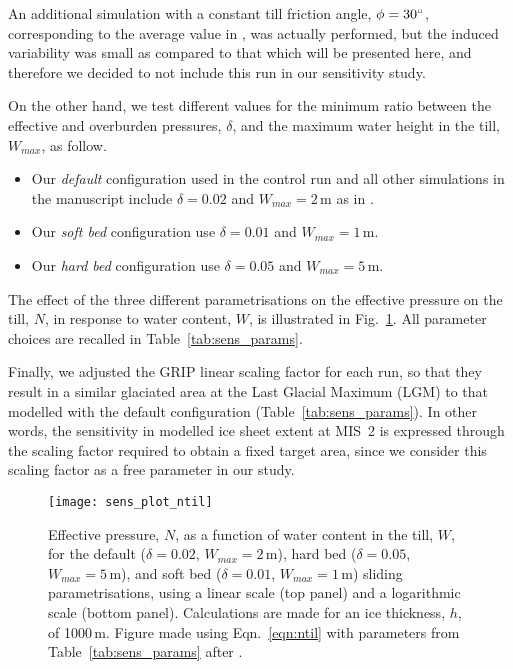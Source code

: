 An additional simulation with a constant till friction angle, $\phi=30^{\circ}$,
corresponding to the average value in \citet[p.~268]{Cuffey.Paterson.2010}, was
actually performed, but the induced variability was small as compared to that
which will be presented here, and therefore we decided to not include this run
in our sensitivity study.

On the other hand, we test different values for the minimum ratio between the
effective and overburden pressures, $\delta$, and the maximum water
height in the till, $W_{max}$, as follow.

\begin{itemize}
    \item{Our \emph{default} configuration used in the control run and all other
          simulations in the manuscript include $\delta=0.02$ and
          $W_{max}=2$\,m as in \citet{Bueler.Pelt.2015}.}
    \item{Our \emph{soft bed} configuration use $\delta=0.01$ and
          $W_{max}=1$\,m.}
    \item{Our \emph{hard bed} configuration use $\delta=0.05$ and
          $W_{max}=5$\,m.}
\end{itemize}

The effect of the three different parametrisations on the effective pressure on
the till, $N$, in response to water content, $W$, is illustrated in
Fig.~\ref{fig:sens_plot_ntil}.
All parameter choices are recalled in Table~\ref{tab:sens_params}.

Finally, we adjusted the GRIP linear scaling factor for each run, so that they
result in a similar glaciated area at the Last Glacial Maximum (LGM) to that
modelled with the default configuration (Table~\ref{tab:sens_params}).
In other words, the sensitivity in modelled ice sheet extent at MIS~2 is
expressed through the scaling factor required to obtain a fixed target area,
since we consider this scaling factor as a free parameter in our study.

\begin{figure}
    \centering
    \texttt{[image: sens\_plot\_ntil]}
    \caption{Effective pressure, $N$, as a function of water content in the
             till, $W$, for the default ($\delta=0.02$, $W_{max}=2$\,m),
             hard bed ($\delta=0.05$, $W_{max}=5$\,m), and soft bed
             ($\delta=0.01$, $W_{max}=1$\,m) sliding parametrisations, using a
             linear scale (top panel) and a logarithmic scale (bottom panel).
             Calculations are made for an ice thickness, $h$, of 1000\,m.
             Figure made using Eqn.~\ref{eqn:ntil} with parameters from
             Table~\ref{tab:sens_params} after
             \citet[Fig.~1]{Bueler.Pelt.2015}.}
    \label{fig:sens_plot_ntil}
\end{figure}

